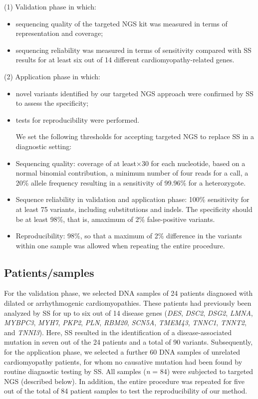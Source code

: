 \noindent(1) Validation phase in which:
\begin{itemize}
	\item sequencing quality of the targeted NGS kit was measured in terms of representation and coverage;
	\item sequencing reliability was measured in terms of sensitivity compared with SS results for at least six out of 14 different cardiomyopathy-related genes.
\end{itemize}
(2) Application phase in which:
\begin{itemize}
	\item novel variants identified by our targeted NGS approach were confirmed by SS to assess the specificity;
	\item tests for reproducibility were performed. 
	
	We set the following thresholds for accepting targeted NGS to replace SS in a diagnostic setting:
	\item Sequencing quality: coverage of at least×30 for each nucleotide, based on a normal binomial contribution, a minimum number of four reads for a call, a 20\% allele frequency resulting in a sensitivity of 99.96\% for a heterozygote.
	\item Sequence reliability in validation and application phase: 100\% sensitivity for at least 75 variants, including substitutions and indels. The specificity should be at least 98\%, that is, amaximum of 2\% false-positive variants.
	\item Reproducibility: 98\%, so that a maximum of 2\% difference in the variants within one sample was allowed when repeating the entire procedure. 
\end{itemize}

\subsection{Patients/samples}
For the validation phase, we selected DNA samples of 24 patients diagnosed with dilated or arrhythmogenic cardiomyopathies. 
These patients had previously been analyzed by SS for up to six out of 14 disease genes (\textsl{DES}, \textsl{DSC2}, \textsl{DSG2}, \textsl{LMNA}, \textsl{MYBPC3}, \textsl{MYH7}, \textsl{PKP2}, \textsl{PLN}, \textsl{RBM20}, \textsl{SCN5A}, \textsl{TMEM43}, \textsl{TNNC1}, \textsl{TNNT2}, and \textsl{TNNI3}). 
Here, SS resulted in the identification of a disease-associated mutation in seven out of the 24 patients and a total of 90 variants. 
Subsequently, for the application phase, we selected a further 60 DNA samples of unrelated cardiomyopathy patients, for whom no causative mutation had been found by routine diagnostic testing by SS. 
All samples (\textsl{n} = 84) were subjected to targeted NGS (described below). 
In addition, the entire procedure was repeated for five out of the total of 84 patient samples to test the reproducibility of our method.

